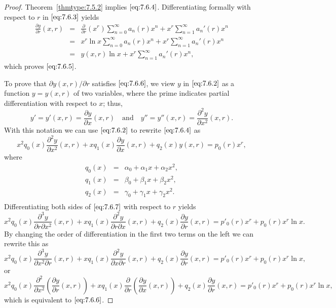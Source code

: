 \documentclass{ximera}
\begin{document}
\begin{proof}
Theorem~\ref{thmtype:7.5.2} implies $\eqref{eq:7.6.4}$. Differentiating
formally
with respect to $r$ in $\eqref{eq:7.6.3}$ yields
\begin{eqnarray*}
\frac{\partial y}{\partial r} (x,r)&=&\frac{\partial}{\partial r}(x^r)\sum_{n=0}^\infty
a_n(r)x^n +x^r\sum_{n=1}^\infty  a_n'(r)x^n\\
&=&x^r\ln x\sum_{n=0}^\infty
a_n(r)x^n +x^r\sum_{n=1}^\infty  a_n'(r)x^n\\
&=&y(x,r) \ln x +
x^r\sum_{n=1}^\infty  a_n'(r)x^n,
\end{eqnarray*}
which proves $\eqref{eq:7.6.5}$.

To prove that  $\partial y(x,r)/\partial r$ satisfies $\eqref{eq:7.6.6}$, we
view $y$ in $\eqref{eq:7.6.2}$ as a function $y=y(x,r)$  of two
variables, where the prime indicates partial differentiation with
respect to $x$;   thus,
$$
y'=y'(x,r)=\frac{\partial y}{\partial x}(x,r)\quad\mbox{and}\quad
y''=y''(x,r)=\frac{\partial^2 y}{\partial x^2}(x,r).
$$
With this notation we can use $\eqref{eq:7.6.2}$ to rewrite $\eqref{eq:7.6.4}$ as
\begin{equation} \label{eq:7.6.7}
x^2q_0(x)\frac{\partial^2 y}{\partial x^2}(x,r)+xq_1(x)\frac{\partial y}{\partial x}(x,r)+q_2(x)y(x,r)=p_0(r)x^r,
\end{equation}
where
\begin{eqnarray*}
q_0(x)&=&\alpha_0+\alpha_1x+\alpha_2x^2,\\
q_1(x)&=&\beta_0+\beta_1x+\beta_2x^2,\\
q_2(x)&=&\gamma_0+\gamma_1x+\gamma_2x^2.\\
\end{eqnarray*}
Differentiating both sides of $\eqref{eq:7.6.7}$ with respect to $r$
yields
$$
x^2q_0(x)\frac{\partial^3y}{\partial r\partial x^2}(x,r)+
xq_1(x)\frac{\partial^2y}{\partial r\partial x}(x,r)+q_2(x)\frac{\partial
y}{\partial r}(x,r)=p'_0(r)x^r+p_0(r) x^r \ln x.
$$
By changing the order of differentiation in the first two terms on the left
we can rewrite this  as
$$
x^2q_0(x)\frac{\partial^3 y}{\partial x^2\partial r}(x,r)
+xq_1(x)\frac{\partial^2 y}{\partial x\partial r}(x,r)+q_2(x)\frac{\partial
y}{\partial r}(x,r)=p'_0(r)x^r+p_0(r) x^r \ln x,
$$
or
$$
x^2q_0(x)\frac{\partial^2}{\partial x^2}
\left(\frac{\partial y}{\partial r}(x,r)\right)
+xq_1(x)\frac{\partial}{\partial r}\left(\frac{\partial y}{\partial
x}(x,r)\right) +q_2(x)\frac{\partial y}{\partial r}(x,r)=
p'_0(r)x^r+p_0(r) x^r \ln x,
$$
which is equivalent to $\eqref{eq:7.6.6}$.
\end{proof}
\end{document}
